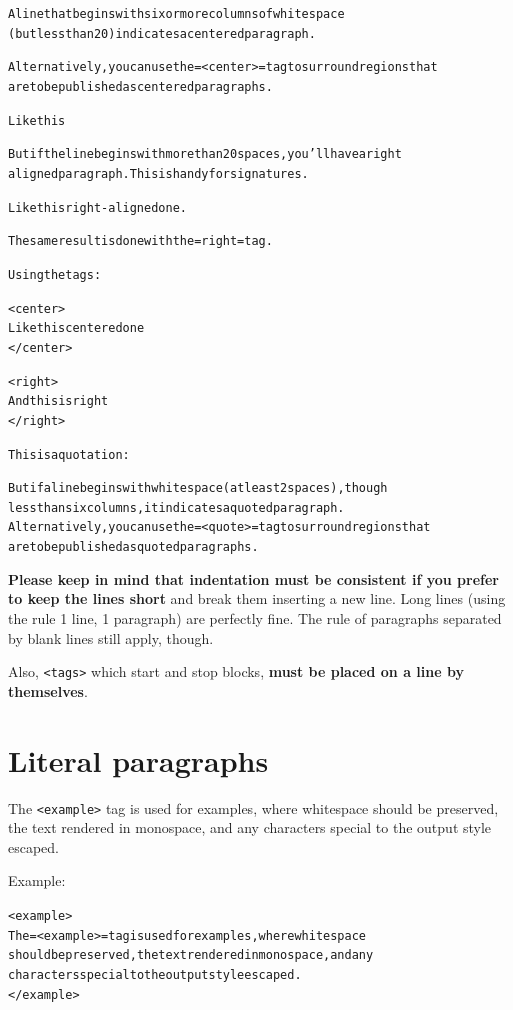 \documentclass[DIV=12,%
               BCOR=0mm,%
               fontsize=10pt,%
               oneside,%
               paper=210mm:11in]{scrbook}
\begin{document}
\begin{alltt}
A line that begins with six or more columns of whitespace
(but less than 20) indicates a centered paragraph.

Alternatively, you can use the =<center>= tag to surround regions that
are to be published as centered paragraphs.

           Like this

But if the line begins with more than 20 spaces, you'll have a right
aligned paragraph. This is handy for signatures.

                                     Like this right-aligned one.

The same result is done with the =right= tag.

Using the tags:

<center>
Like this centered one
</center>

<right>
And this is right
</right>

This is a quotation:

  But if a line begins with whitespace (at least 2 spaces), though
  less than six columns, it indicates a quoted paragraph.
  Alternatively, you can use the =<quote>= tag to surround regions that
  are to be published as quoted paragraphs.

\end{alltt}


\textbf{Please keep in mind that indentation must be consistent if you prefer
to keep the lines short} and break them inserting a new line. Long
lines (using the rule 1 line, 1 paragraph) are perfectly fine. The
rule of paragraphs separated by blank lines still apply, though.


Also, \texttt{<tags>} which start and stop blocks, \textbf{must be placed on a line by
themselves}.

\section{Literal paragraphs}


The \texttt{<example>} tag is used for examples, where whitespace should be
preserved, the text rendered in monospace, and any characters special
to the output style escaped.


Example:


\begin{alltt}
 <example>
 The =<example>= tag is used for examples, where whitespace
 should be preserved, the text rendered in monospace, and any
 characters special to the output style escaped.
 </example>

\end{alltt}
\end{document}
